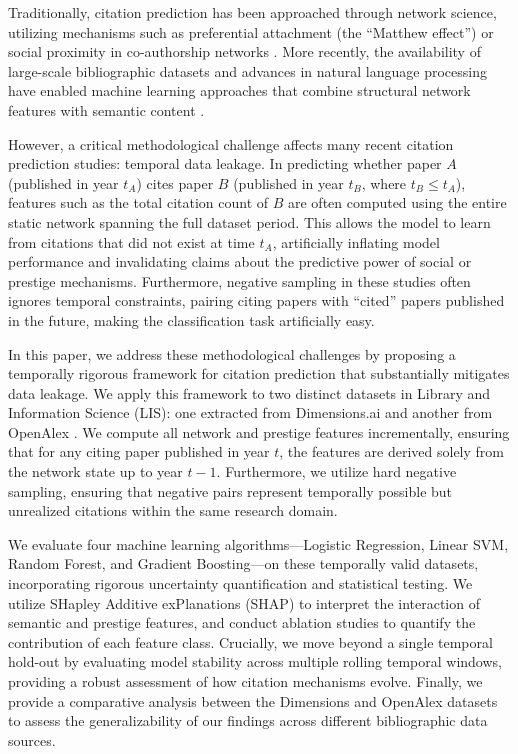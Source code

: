 \documentclass[12pt,a4paper]{article}
\begin{document}
Traditionally, citation prediction has been approached through network science, utilizing mechanisms such as preferential attachment (the ``Matthew effect'') \cite{merton1968matthew, de1976general, barabasi1999emergence} or social proximity in co-authorship networks \cite{newman2004coauthorship}. More recently, the availability of large-scale bibliographic datasets and advances in natural language processing have enabled machine learning approaches that combine structural network features with semantic content \cite{chakraborty2015towards, shibata2012link}.

However, a critical methodological challenge affects many recent citation prediction studies: temporal data leakage. In predicting whether paper $A$ (published in year $t_A$) cites paper $B$ (published in year $t_B$, where $t_B \le t_A$), features such as the total citation count of $B$ are often computed using the entire static network spanning the full dataset period. This allows the model to learn from citations that did not exist at time $t_A$, artificially inflating model performance and invalidating claims about the predictive power of social or prestige mechanisms. Furthermore, negative sampling in these studies often ignores temporal constraints, pairing citing papers with ``cited'' papers published in the future, making the classification task artificially easy.

In this paper, we address these methodological challenges by proposing a temporally rigorous framework for citation prediction that substantially mitigates data leakage. We apply this framework to two distinct datasets in Library and Information Science (LIS): one extracted from Dimensions.ai \cite{herzog2020dimensions} and another from OpenAlex \cite{priem2022openalex}. We compute all network and prestige features incrementally, ensuring that for any citing paper published in year $t$, the features are derived solely from the network state up to year $t-1$. Furthermore, we utilize hard negative sampling, ensuring that negative pairs represent temporally possible but unrealized citations within the same research domain.

We evaluate four machine learning algorithms---Logistic Regression, Linear SVM, Random Forest, and Gradient Boosting---on these temporally valid datasets, incorporating rigorous uncertainty quantification and statistical testing. We utilize SHapley Additive exPlanations (SHAP) \cite{lundberg2017unified} to interpret the interaction of semantic and prestige features, and conduct ablation studies to quantify the contribution of each feature class. Crucially, we move beyond a single temporal hold-out by evaluating model stability across multiple rolling temporal windows, providing a robust assessment of how citation mechanisms evolve. Finally, we provide a comparative analysis between the Dimensions and OpenAlex datasets to assess the generalizability of our findings across different bibliographic data sources.
\end{document}
